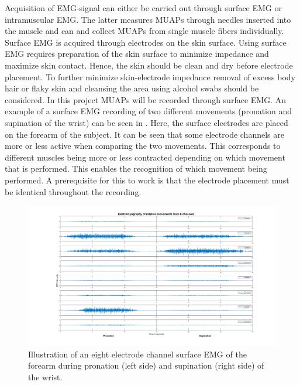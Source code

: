 Acquisition of EMG-signal can either be carried out through surface EMG or intramuscular EMG. The latter measures MUAPs through needles inserted into the muscle and can and collect MUAPs from single muscle fibers individually. Surface EMG is acquired through electrodes on the skin surface. \cite{Cram2012}  Using surface EMG requires preparation of the skin surface to minimize impedance and maximize skin contact. Hence, the skin should be clean and dry before electrode placement. To further minimize skin-electrode impedance removal of excess body hair or flaky skin and cleansing the area using alcohol swabs should be considered. \cite{Turker2013,Cram2012} In this project MUAPs will be recorded through surface EMG. An example of a surface EMG recording of two different movements (pronation and supination of the wrist) can be seen in . Here, the surface electrodes are placed on the forearm of the subject. It can be seen that some electrode channels are more or less active when comparing the two movements. This corresponds to different muscles being more or less contracted depending on which movement that is performed. This enables the recognition of which movement being performed. A prerequisite for this to work is that the electrode placement must be identical throughout the recording.

\begin{figure}[H]                 
	\includegraphics[width=1\textwidth]{figures/Emg_rot}  
	\caption{Illustration of an eight electrode channel surface EMG of the forearm during pronation (left side) and supination (right side) of the wrist.}
	\label{fig:Emg_rot} 
\end{figure}

